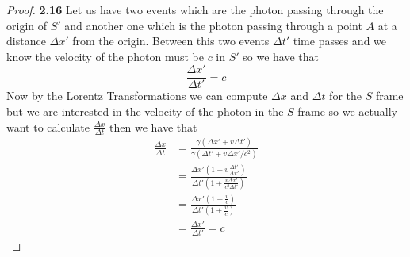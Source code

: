 \documentclass[11pt]{article}
\theoremstyle{definition}
\begin{document}
\cleardoublepage
	\begin{proof}{\textbf{2.16}}
        Let us have two events which are the photon passing through the origin of
        $S'$ and another one which is the photon passing through a point $A$ at a distance
        $\Delta x'$ from the origin. Between this two events $\Delta t'$ time passes 
        and we know the velocity of the photon must be $c$ in $S'$ so we have that
        $$\frac{\Delta x'}{\Delta t'} = c$$
        Now by the Lorentz Transformations we can compute $\Delta x$ and 
        $\Delta t$ for the $S$ frame but we are interested in the velocity of the
        photon in the $S$ frame so we actually want to calculate 
        $\frac{\Delta x}{\Delta t}$ then we have that
        \begin{align*}
            \frac{\Delta x}{\Delta t} &= \frac{\gamma(\Delta x' + v\Delta t')}{\gamma(\Delta t' + v\Delta x'/c^2)}\\
                &= \frac{\Delta x'(1 + v\frac{\Delta t'}{\Delta x'})}{\Delta t'(1 + \frac{v\Delta x'}{c^2\Delta t'})}\\
                &= \frac{\Delta x'(1 + \frac{v}{c})}{\Delta t'(1 + \frac{v}{c})}\\
                &= \frac{\Delta x'}{\Delta t'} = c
        \end{align*} 
    \end{proof}
\end{document}
